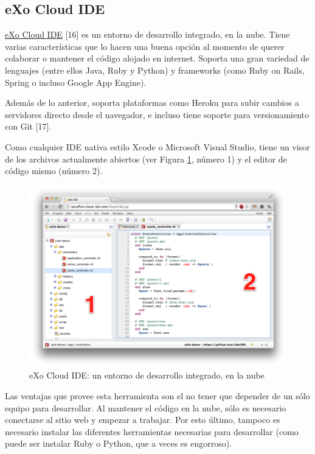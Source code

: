 \documentclass[12pt,spanish,letter]{report}
\makeatletter
\def\maxwidth{\ifdim\Gin@nat@width>\linewidth\linewidth
\else\Gin@nat@width\fi}
\let\Oldincludegraphics\includegraphics
\renewcommand{\includegraphics}[1]{\Oldincludegraphics[width=\maxwidth]{#1}}
\makeatother
\begin{document}
\subsection{eXo Cloud IDE}

\href{http://cloud-ide.com}{eXo Cloud IDE} {[}16{]} es un entorno de
desarrollo integrado, en la nube. Tiene varias características que lo
hacen una buena opción al momento de querer colaborar o mantener el
código alojado en internet. Soporta una gran variedad de lenguajes
(entre ellos Java, Ruby y Python) y frameworks (como Ruby on Rails,
Spring o incluso Google App Engine).

Además de lo anterior, soporta plataformas como Heroku para subir
cambios a servidores directo desde el navegador, e incluso tiene soporte
para versionamiento con Git {[}17{]}.

Como cualquier IDE nativa estilo Xcode o Microsoft Visual Studio, tiene
un visor de los archivos actualmente abiertos (ver Figura
\ref{figure:exo-ide}, número 1) y el editor de código mismo (número 2).

\begin{figure}[htbp]
\centering
\includegraphics{figures/exo-ide-big.png}
\caption{eXo Cloud IDE: un entorno de desarrollo integrado, en la
nube\label{figure:exo-ide}}
\end{figure}

Las ventajas que provee esta herramienta son el no tener que depender de
un sólo equipo para desarrollar. Al mantener el código en la nube, sólo
es necesario conectarse al sitio web y empezar a trabajar. Por esto
último, tampoco es necesario instalar las diferentes herramientas
necesarias para desarrollar (como puede ser instalar Ruby o Python, que
a veces es engorroso).
\end{document}
